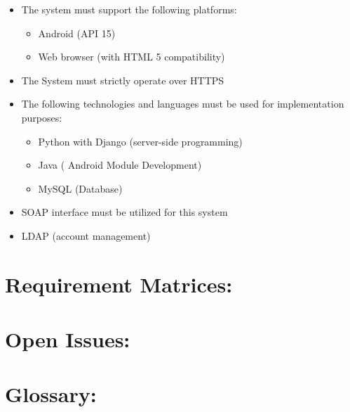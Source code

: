 \documentclass[12pt]{article}
\begin{document}
		\begin{itemize}
			\item The system must support the following platforms: 
				\begin{itemize}
					\item Android (API 15)
					\item Web browser (with HTML 5 compatibility)
				\end{itemize}
				
			\item The System must strictly operate over HTTPS
			\item The following technologies and languages must be used for implementation purposes:
				\begin{itemize}
					\item Python with Django (server-side programming)
					\item Java ( Android Module Development)
					\item MySQL (Database)
				\end{itemize}
				\item SOAP interface must be utilized for this system
				\item LDAP (account management)
		\end{itemize}
	
	\vspace{0.5in}
	
	\newpage
	\section{Requirement Matrices:}
	\vspace{0.2in}
	
	
	
	\vspace{0.5in}
	
	\section{Open Issues:}
	\vspace{0.2in}
	
	
	
	\vspace{0.5in}
	
	\section{Glossary:}
	\vspace{0.2in}
		
	
	\vspace{0.5in}
		
\end{document}
